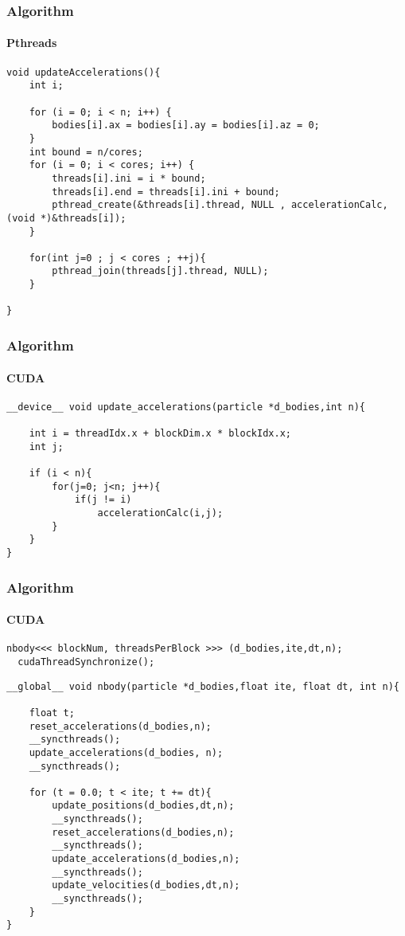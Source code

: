\begin{frame}[fragile]
\frametitle{Algorithm}
\framesubtitle{Pthreads}
\begin{lstlisting}[style=C]
void updateAccelerations(){
    int i;

    for (i = 0; i < n; i++) {
        bodies[i].ax = bodies[i].ay = bodies[i].az = 0;
    }
    int bound = n/cores;
    for (i = 0; i < cores; i++) {
        threads[i].ini = i * bound;
        threads[i].end = threads[i].ini + bound;
        pthread_create(&threads[i].thread, NULL , accelerationCalc, (void *)&threads[i]);
    }

    for(int j=0 ; j < cores ; ++j){
        pthread_join(threads[j].thread, NULL);
    }

}
\end{lstlisting}
\end{frame}

\begin{frame}[fragile]
\frametitle{Algorithm}
\framesubtitle{CUDA}
\begin{lstlisting}[style=C]
__device__ void update_accelerations(particle *d_bodies,int n){

    int i = threadIdx.x + blockDim.x * blockIdx.x;
    int j;

    if (i < n){
        for(j=0; j<n; j++){
            if(j != i)
                accelerationCalc(i,j);
        }
    }
}
\end{lstlisting}
\end{frame}


\begin{frame}[fragile]
\frametitle{Algorithm}
\framesubtitle{CUDA}

\begin{lstlisting}[style=C]
  nbody<<< blockNum, threadsPerBlock >>> (d_bodies,ite,dt,n);
  cudaThreadSynchronize();
\end{lstlisting}

\begin{lstlisting}[style=C]
__global__ void nbody(particle *d_bodies,float ite, float dt, int n){

    float t;
    reset_accelerations(d_bodies,n);
    __syncthreads();
    update_accelerations(d_bodies, n);
    __syncthreads();

    for (t = 0.0; t < ite; t += dt){
        update_positions(d_bodies,dt,n);
        __syncthreads();
        reset_accelerations(d_bodies,n);
        __syncthreads();
        update_accelerations(d_bodies,n);
        __syncthreads();
        update_velocities(d_bodies,dt,n);
        __syncthreads();
    }
}
\end{lstlisting}
\end{frame}
